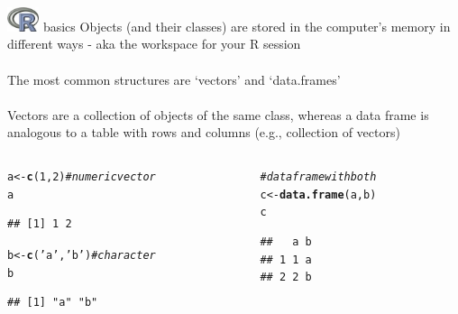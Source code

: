 \documentclass[xcolor=svgnames]{beamer}\usepackage[]{graphicx}\usepackage[]{color}
\makeatletter
\newcommand{\hlnum}[1]{\textcolor[rgb]{0.686,0.059,0.569}{#1}}%
\newcommand{\hlstr}[1]{\textcolor[rgb]{0.192,0.494,0.8}{#1}}%
\newcommand{\hlcom}[1]{\textcolor[rgb]{0.678,0.584,0.686}{\textit{#1}}}%
\newcommand{\hlstd}[1]{\textcolor[rgb]{0.345,0.345,0.345}{#1}}%
\newcommand{\hlkwb}[1]{\textcolor[rgb]{0.69,0.353,0.396}{#1}}%
\newcommand{\hlkwd}[1]{\textcolor[rgb]{0.737,0.353,0.396}{\textbf{#1}}}%
\newenvironment{kframe}{%
 \def\at@end@of@kframe{}%
 \ifinner\ifhmode%
  \def\at@end@of@kframe{\end{minipage}}%
  \begin{minipage}{\columnwidth}%
 \fi\fi%
 \def\FrameCommand##1{\hskip\@totalleftmargin \hskip-\fboxsep
 \colorbox{shadecolor}{##1}\hskip-\fboxsep
     \hskip-\linewidth \hskip-\@totalleftmargin \hskip\columnwidth}%
 \MakeFramed {\advance\hsize-\width
   \@totalleftmargin\z@ \linewidth\hsize
   \@setminipage}}%
 {\par\unskip\endMakeFramed%
 \at@end@of@kframe}
\newenvironment{knitrout}{}{} %
\makeatother
\begin{document}
\begin{frame}[fragile]{\includegraphics[width=0.07\textwidth]{Rlogo.jpg} \hspace{0.01in} basics}
Objects (and their classes) are stored in the computer's memory in different ways - aka the workspace for your R session\\~\\
The most common structures are `vectors' and `data.frames'\\~\\
Vectors are a collection of objects of the same class, whereas a data frame is analogous to a table with rows and columns (e.g., collection of vectors)
\vspace{-0.2in}
\begin{columns}[t]
\begin{column}{0.5\textwidth}
\begin{knitrout}
\color{fgcolor}\begin{kframe}
\begin{alltt}
\hlstd{a} \hlkwb{<-} \hlkwd{c}\hlstd{(}\hlnum{1}\hlstd{,}\hlnum{2}\hlstd{)} \hlcom{# numeric vector}
\hlstd{a}
\end{alltt}
\begin{verbatim}
## [1] 1 2
\end{verbatim}
\begin{alltt}
\hlstd{b} \hlkwb{<-} \hlkwd{c}\hlstd{(}\hlstr{'a'}\hlstd{,} \hlstr{'b'}\hlstd{)} \hlcom{# character}
\hlstd{b}
\end{alltt}
\begin{verbatim}
## [1] "a" "b"
\end{verbatim}
\end{kframe}
\end{knitrout}
\end{column}
\begin{column}{0.5\textwidth}
\begin{knitrout}
\color{fgcolor}\begin{kframe}
\begin{alltt}
\hlcom{# data frame with both}
\hlstd{c} \hlkwb{<-} \hlkwd{data.frame}\hlstd{(a,b)}
\hlstd{c}
\end{alltt}
\begin{verbatim}
##   a b
## 1 1 a
## 2 2 b
\end{verbatim}
\end{kframe}
\end{knitrout}
\end{column}
\end{columns}
\end{frame}
\end{document}
